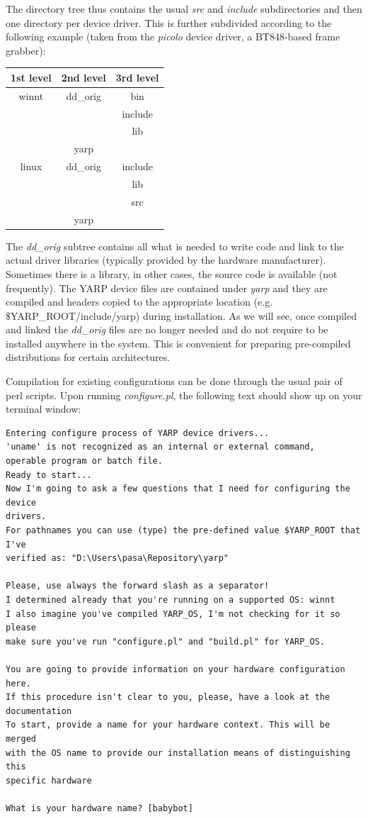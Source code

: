 The directory tree thus contains the usual {\em src} and {\em include} subdirectories and then one directory per device driver. This is further subdivided according to the following example (taken from the {\em picolo} device driver, a BT848-based frame grabber):

\begin{table}[h]
	\centering
		\begin{tabular}{|c|c|c|}
		\hline
			1st level & 2nd level & 3rd level \\
			\hline \hline
			winnt & dd\_orig & bin \\
			 &  & include \\
			 &  & lib \\
			 & yarp & \\
			\hline
			linux & dd\_orig & include \\
			 &  & lib \\
			 &  & src \\
			 & yarp & \\
			\hline
		\end{tabular}
\end{table}

The {\em dd\_orig} subtree contains all what is needed to write code and link to the actual driver libraries (typically provided by the hardware manufacturer). Sometimes there is a library, in other cases, the source code is available (not frequently). The YARP device files are contained under {\em yarp} and they are compiled and headers copied to the appropriate location (e.g. \$YARP\_ROOT/include/yarp) during installation. As we will see, once compiled and linked the {\em dd\_orig} files are no longer needed and do not require to be installed anywhere in the system. This is convenient for preparing pre-compiled distributions for certain architectures.

Compilation for existing configurations can be done through the usual pair of perl scripts. Upon running {\em configure.pl}, the following text should show up on your terminal window:

\begin{verbatim}
Entering configure process of YARP device drivers...
'uname' is not recognized as an internal or external command,
operable program or batch file.
Ready to start...
Now I'm going to ask a few questions that I need for configuring the device 
drivers.
For pathnames you can use (type) the pre-defined value $YARP_ROOT that I've 
verified as: "D:\Users\pasa\Repository\yarp"

Please, use always the forward slash as a separator!
I determined already that you're running on a supported OS: winnt
I also imagine you've compiled YARP_OS, I'm not checking for it so please 
make sure you've run "configure.pl" and "build.pl" for YARP_OS.

You are going to provide information on your hardware configuration here. 
If this procedure isn't clear to you, please, have a look at the 
documentation
To start, provide a name for your hardware context. This will be merged 
with the OS name to provide our installation means of distinguishing this 
specific hardware

What is your hardware name? [babybot]
\end{verbatim}


